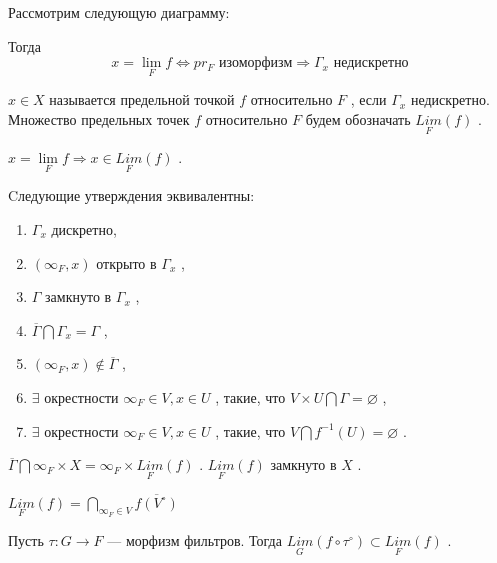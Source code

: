 \SSsect Рассмотрим следующую диаграмму:


Тогда
\[ x = \lim_{F} f \Leftrightarrow pr_F \mbox{~изоморфизм} \Rightarrow \Gamma_x \mbox{~недискретно} \]

\SSsect[def] \( x \in X \) называется предельной точкой \( f \) относительно \( F \) , если \( \Gamma_x \) недискретно. Множество предельных точек \( f \) относительно \( F \) будем обозначать \( \underset{F}{Lim}(f) \) .

\SSsect \( x = \lim\limits_{F} f \Rightarrow x \in \underset{F}{Lim}(f) \) .

\pagebreak

\SSsect Cледующие утверждения эквивалентны:

\begin{enumerate}[label={\alph*)}]
\item \( \Gamma_x \) дискретно, 
\item \( (\infty_F,x) \) открыто в \( \Gamma_x \) ,
\item \( \Gamma \) замкнуто в \( \Gamma_x \) ,
\item \( \overline{\Gamma} \bigcap \Gamma_x = \Gamma \) , 
\item \( (\infty_F,x) \notin \overline{\Gamma} \) , 
\item \( \exists \) окрестности \( \infty_F \in V, x \in U\) , такие, что \( V \times U \bigcap \Gamma = \varnothing \) ,
\item \( \exists \) окрестности \( \infty_F \in V, x \in U\) , такие, что \( V \bigcap f^{-1}(U) = \varnothing \) . 
\end{enumerate}

\SSsect \( \overline{\Gamma} \bigcap \infty_F \times X = \infty_F \times \underset{F}{Lim}(f) \) .
\( \underset{F}{Lim}(f) \) замкнуто в \( X \) .

\SSsect \( \underset{F}{Lim}(f) = \bigcap\limits_{\infty_F \in V} \overline{f(V^\circ)} \)

\SSsect Пусть \( \tau : G \rightarrow F \) --- морфизм фильтров. Тогда \( \underset{G}{Lim}(f \circ \tau^\circ) \subset \underset{F}{Lim}(f) \) .

